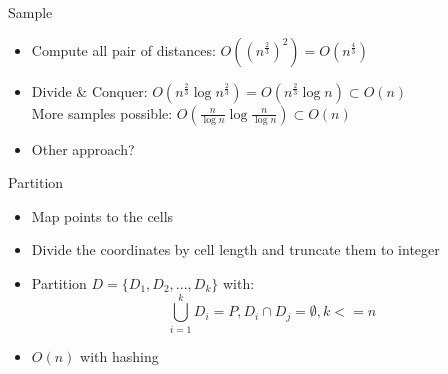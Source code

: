 \documentclass[18pt]{beamer}
\def \loose {15pt}
\begin{document}

\begin{frame}{Sample}
	\begin{itemize}
	\setlength{\itemsep}{\loose}
		\item Compute all pair of distances: $O((n^{\frac{2}{3}})^2) = O(n^{\frac{4}{3}})$
		\item Divide \& Conquer: $O(n^{\frac{2}{3}}\log n^{\frac{2}{3}}) = O(n^{\frac{2}{3}}\log n) \subset O(n)$ \\
		\hspace{1em} More samples possible: $O(\frac{n}{\log n} \log \frac{n}{\log n}) \subset O(n) $
		\item Other approach?
	\end{itemize}
\end{frame}

\begin{frame}{Partition}
	\begin{itemize}
		\setlength{\itemsep}{\loose}
		\item Map points to the cells
		\item Divide the coordinates by cell length and truncate them to integer

		\item Partition $D = \{D_1, D_2, ..., D_k\}$ with:
			 $$\bigcup_{i=1}^k D_i = P, D_i \cap D_j = \emptyset, k <= n$$
				\item $O(n)$ with hashing
	\end{itemize}
\end{frame}
\end{document}
